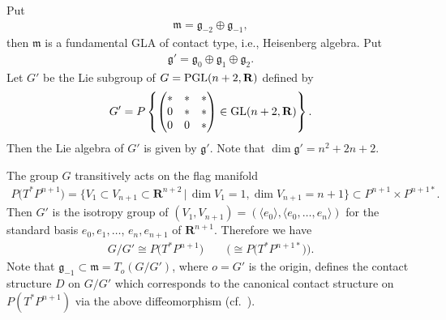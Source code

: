Put
\begin{gather*}
\mathfrak{m}= \mathfrak{g}_{-2}\oplus \mathfrak{g}_{-1},
\end{gather*}
then $\mathfrak{m}$ is a fundamental GLA of contact type, i.e., Heisenberg
algebra.
Put
\begin{gather*}
\mathfrak{g}'=\mathfrak{g}_0 \oplus \mathfrak{g}_1 \oplus
\mathfrak{g}_2.
\end{gather*}
Let $G'$ be the Lie subgroup of $G = {\rm PGL}(n+2, {\mathbf{R}})$ def\/ined by
\begin{gather*}
G' = P\left\{
\begin{pmatrix}
* & * & * \\
0 & * & * \\
0 & 0 & *
\end{pmatrix}
\in
{\rm GL}(n+2, {\mathbf{R}})
\right\}.
\end{gather*}
Then the Lie algebra of $G'$ is given by $\mathfrak{g}'$. Note that
$\dim \mathfrak{g}' = n^2 + 2n + 2$.

The group $G$ transitively acts on the f\/lag manifold
\begin{gather*}
P\big(T^*P^{n+1}\big) = \big\{ V_1 \subset V_{n+1} \subset {\mathbf{R}}^{n+2} \,|\,
\dim V_1 = 1, \dim V_{n+1} = n + 1 \big\} \subset P^{n+1}\times P^{n+1*}.
\end{gather*}
Then $G'$ is the isotropy group of $(V_1, V_{n+1}) = (\langle e_0 \rangle,
\langle e_0, \dots, e_n \rangle)$ for the standard basis $e_0, e_1, \dots$,
$e_n, e_{n+1}$ of ${\mathbf{R}}^{n+1}$.
Therefore we have
\begin{gather*}
G/G' \cong P\big(T^*P^{n+1}\big) \qquad \big(\cong P\big(T^*P^{n+1*}\big)\big).
\end{gather*}
Note that $\mathfrak{g}_{-1} \subset \mathfrak{m} = T_o(G/G')$, where
$o = G'$ is the origin,
def\/ines the contact structure $D$ on $G/G'$ which corresponds to
the canonical contact structure
on $P(T^*P^{n+1})$ via the above dif\/feomorphism (cf.~\cite{I-M}).

